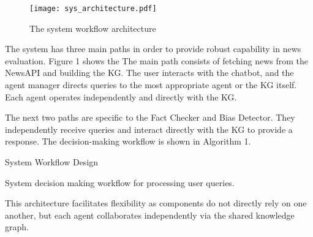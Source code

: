 \documentclass{scrartcl}
\begin{document}
\begin{figure}[h!]
\begin{center}
\texttt{[image: sys\_architecture.pdf]}
\end{center}
\caption{The system workflow architecture}
\label{setup}
\end{figure}

The system has three main paths in order to provide robust capability in news evaluation. Figure 1 shows the  The main path consists of fetching news from the NewsAPI and building the KG. The user interacts with the chatbot, and the agent manager directs queries to the most appropriate agent or the KG itself. Each agent operates independently and directly with the KG.

The next two paths are specific to the Fact Checker and Bias Detector. They independently receive queries and interact directly with the KG to provide a response. The decision-making workflow is shown in Algorithm 1.

\renewcommand{\thealgocf}{1}
\begin{algorithm}[H]
\caption{System Workflow Design}





\caption{System decision making workflow for processing user queries.}
\end{algorithm}

This architecture facilitates flexibility as components do not directly rely on one another, but each agent collaborates independently via the shared knowledge graph. 
\end{document}
